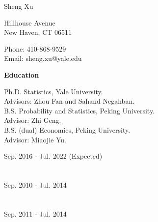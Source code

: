 \documentclass{article}
\begin{document}
\begin{Huge}
\noindent Sheng Xu
\end{Huge}

\vspace{5mm}
\begin{minipage}{0.7\linewidth}
  \flushleft
{} Hillhouse Avenue \\
\noindent New Haven, CT 06511
\end{minipage}
\hfill
\begin{minipage}{0.29\linewidth}
  Phone: 410-868-9529 \\
  Email: sheng.xu@yale.edu
\end{minipage}

\vspace{5mm}
\begin{large}
\noindent \textbf{Education}
\end{large}
\vspace{5mm}

\begin{minipage}{0.65\linewidth}
\noindent Ph.D. Statistics, Yale University.\\
Advisors: Zhou Fan and Sahand Negahban.\\

\noindent B.S. Probability and Statistics, Peking University. \\
Advisor: Zhi Geng.\\

\noindent B.S. (dual) Economics, Peking University. \\
Advisor: Miaojie Yu.\\
\end{minipage}\hfill
\begin{minipage}{0.34\linewidth}
\flushright
Sep. 2016 - Jul. 2022 (Expected)  \\
~\\
~\\
Sep. 2010 - Jul. 2014\\
~\\
~\\
Sep. 2011 - Jul. 2014\\
\end{minipage}





\end{document}
